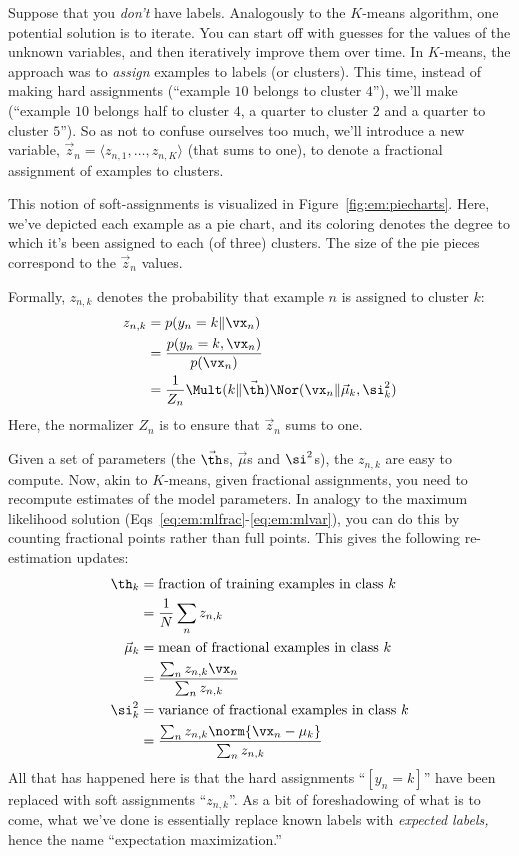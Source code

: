 %
%
Suppose that you \emph{don't} have labels.  Analogously to the
$K$-means algorithm, one potential solution is to iterate.  You can
start off with guesses for the values of the unknown variables, and
then iteratively improve them over time.  In $K$-means, the approach
was to \emph{assign} examples to labels (or clusters).  This time,
instead of making hard assignments (``example $10$ belongs to cluster
$4$''), we'll make  (``example $10$ belongs
half to cluster $4$, a quarter to cluster $2$ and a quarter to cluster
$5$'').  So as not to confuse ourselves too much, we'll introduce a
new variable, $\vec z_n = \langle z_{n,1}, \dots, z_{n,K} \rangle$ (that sums
to one), to denote a fractional assignment of examples to clusters.


This notion of soft-assignments is visualized in
Figure~\ref{fig:em:piecharts}.  Here, we've depicted each example as a
pie chart, and its coloring denotes the degree to which it's been
assigned to each (of three) clusters.  The size of the pie pieces
correspond to the $\vec z_n$ values.

Formally, $z_{n,k}$ denotes the probability that example $n$ is
assigned to cluster $k$:
%
\begin{align}
z_{n,k} &= p(y_n = k \| \vx_n) \\
&= \frac {p(y_n = k, \vx_n)} {p(\vx_n)} \\
&= \frac 1 {Z_n} \Mult(k \| \vec\th) \Nor(\vx_n \| \vec\mu_k, \si^2_k)
\end{align}
%
Here, the normalizer $Z_n$ is to ensure that $\vec z_n$ sums to one.

Given a set of parameters (the $\vec\th$s, $\vec\mu$s and $\si^2$s),
the  $z_{n,k}$ are easy to compute.
Now, akin to $K$-means, given fractional assignments, you need to
recompute estimates of the model parameters.  In analogy to the
maximum likelihood solution (Eqs~\eqref{eq:em:mlfrac}-\eqref{eq:em:mlvar}), you
can do this by counting fractional points rather than full points.  This gives
the following re-estimation updates:
%
\begin{align}
\th_k &= \text{fraction of training examples in class $k$} \\
&= \frac 1 N \sum_n z_{n,k} \nonumber\\
\vec\mu_k &= \text{mean of fractional examples in class $k$} \\
&= \frac {\sum_n z_{n,k} \vx_n} {\sum_n z_{n,k}} \nonumber\\
\si^2_k &= \text{variance of fractional examples in class $k$} \\
&= \frac {\sum_n z_{n,k} \norm{\vx_n-\mu_k}} {\sum_n z_{n,k}} \nonumber
\end{align}
%
All that has happened here is that the hard assignments ``$[y_n=k]$''
have been replaced with soft assignments ``$z_{n,k}$''.  As a bit of
foreshadowing of what is to come, what we've done is essentially
replace known labels with \emph{expected labels,} hence the name
``expectation maximization.''


